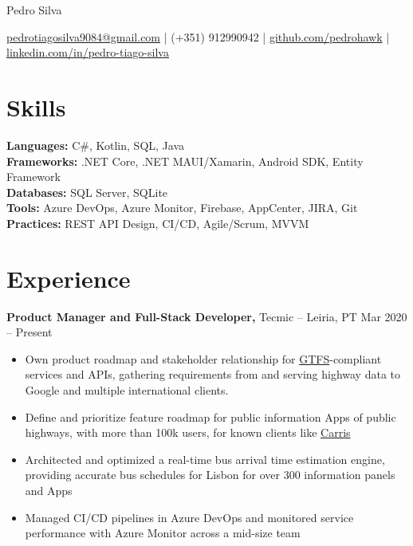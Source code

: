 \documentclass[11pt]{article}       %
\begin{document}
\centerline{\Huge Pedro Silva}

\vspace{5pt}

\centerline{\href{mailto:pedrotiagosilva9084@gmail.com}{pedrotiagosilva9084@gmail.com} | (+351) 912990942 | \href{https://github.com/pedrohawk}{github.com/pedrohawk} | \href{https://www.linkedin.com/in/pedro-tiago-silva/}{linkedin.com/in/pedro-tiago-silva}}

\vspace{-10pt}

\section*{Skills}
\textbf{Languages:} C\#, Kotlin, SQL, Java \\
\textbf{Frameworks:} .NET Core, .NET MAUI/Xamarin, Android SDK, Entity Framework \\
\textbf{Databases:} SQL Server, SQLite \\
\textbf{Tools:} Azure DevOps, Azure Monitor, Firebase, AppCenter, JIRA, Git \\
\textbf{Practices:} REST API Design, CI/CD, Agile/Scrum, MVVM \\

\vspace{-6.5pt}

\section*{Experience}
\textbf{Product Manager and Full-Stack Developer,} {Tecmic} -- Leiria, PT \hfill Mar 2020 -- Present \\
\vspace{-9pt}
\begin{itemize}
  \item Own product roadmap and stakeholder relationship for \href{https://gtfs.org/getting-started/what-is-GTFS/}{GTFS}-compliant services and APIs, gathering requirements from and serving highway data to Google and multiple international clients.
  \item Define and prioritize feature roadmap for public information Apps of public highways, with more than 100k users, for known clients like \href{https://play.google.com/store/search?q=carris&c=apps}{Carris}
  \item Architected and optimized a real-time bus arrival time estimation engine, providing accurate bus schedules for Lisbon for over 300 information panels and Apps
  \item Managed CI/CD pipelines in Azure DevOps and monitored service performance with Azure Monitor across a mid-size team
\end{itemize}
\end{document}

